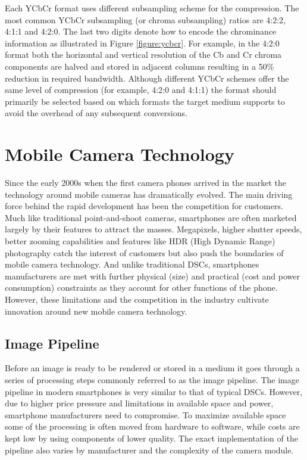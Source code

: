 \documentclass[thesis.tex]{subfiles}
\begin{document}
Each YCbCr format uses different subsampling scheme for the compression. The most common YCbCr subsampling (or chroma subsampling) ratios are 4:2:2, 4:1:1 and 4:2:0. The last two digits denote how to encode the chrominance information as illustrated in Figure \ref{figure:ycbcr}. For example, in the 4:2:0 format both the horizontal and vertical resolution of the Cb and Cr chroma components are halved and stored in adjacent columns resulting in a 50\% reduction in required bandwidth. Although different YCbCr schemes offer the same level of compression (for example, 4:2:0 and 4:1:1) the format should primarily be selected based on which formats the target medium supports to avoid the overhead of any subsequent conversions.

\section{Mobile Camera Technology}
Since the early 2000s when the first camera phones arrived in the market the technology around mobile cameras has dramatically evolved. The main driving force behind the rapid development has been the competition for customers. Much like traditional point-and-shoot cameras, smartphones are often marketed largely by their features to attract the masses. Megapixels, higher shutter speeds, better zooming capabilities and features like HDR (High Dynamic Range) photography catch the interest of customers but also push the boundaries of mobile camera technology. And unlike traditional DSCs, smartphones manufacturers are met with further physical (size) and practical (cost and power consumption) constraints as they account for other functions of the phone. However, these limitations and the competition in the industry cultivate innovation around new mobile camera technology.

\subsection{Image Pipeline}
Before an image is ready to be rendered or stored in a medium it goes through a series of processing steps commonly referred to as the image pipeline. The image pipeline in modern smartphones is very similar to that of typical DSCs. However, due to higher price pressure and limitations in available space and power, smartphone manufacturers need to compromise. To maximize available space some of the processing is often moved from hardware to software, while costs are kept low by using components of lower quality. The exact implementation of the pipeline also varies by manufacturer and the complexity of the camera module.
\end{document}
